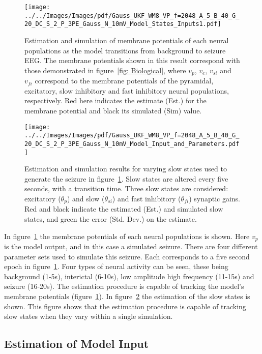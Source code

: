 \begin{figure}
	\centering
		\texttt{[image: ../../Images/Images/pdf/Gauss\_UKF\_WM8\_VP\_f=2048\_A\_5\_B\_40\_G\_20\_DC\_S\_2\_P\_3PE\_Gauss\_N\_10mV\_Model\_States\_Inputs1.pdf]}
	\caption{Estimation and simulation of membrane potentials of each neural populations as the model transitions from background to seizure EEG. The membrane potentials shown in this result correspond with those demonstrated in figure~\ref{fig: Biological}, where $v_{p}$, $v_{e}$, $v_{si}$ and $v_{fi}$ correspond to the membrane potentials of the pyramidal, excitatory, slow inhibitory and fast inhibitory neural populations, respectively. Red here indicates the estimate (Est.) for the membrane potential and black its simulated (Sim) value.}
	\label{fig: ESTMP3VPS}
\end{figure}
\begin{figure}
	\centering
		\texttt{[image: ../../Images/Images/pdf/Gauss\_UKF\_WM8\_VP\_f=2048\_A\_5\_B\_40\_G\_20\_DC\_S\_2\_P\_3PE\_Gauss\_N\_10mV\_Model\_Input\_and\_Parameters.pdf]}
	\caption{Estimation and simulation results for varying slow states used to generate the seizure in figure~\ref{fig: ESTMP3VPS}. Slow states are altered every five seconds, with a transition time. Three slow states are considered: excitatory ($\theta_{p}$) and slow ($\theta_{si}$) and fast inhibitory ($\theta_{fi}$) synaptic gains. Red and black indicate the estimated (Est.) and simulated slow states, and green the error (Std. Dev.) on the estimate.}
	\label{fig: ESTMP3VP}
\end{figure}


In figure~\ref{fig: ESTMP3VPS} the membrane potentials of each neural populations is shown. Here $v_{p}$ is the model output, and in this case a simulated seizure. There are four different parameter sets used to simulate this seizure. Each corresponds to a five second epoch in figure~\ref{fig: ESTMP3VPS}. Four types of neural activity can be seen, these being background (1-5s), interictal (6-10s), low amplitude high frequency (11-15s) and seizure (16-20s). The estimation procedure is capable of tracking the model's membrane potentials (figure~\ref{fig: ESTMP3VPS}). In figure~\ref{fig: ESTMP3VP} the estimation of the slow states is shown. This figure shows that the estimation procedure is capable of tracking slow states when they vary within a single simulation.  

\subsection{Estimation of Model Input}

